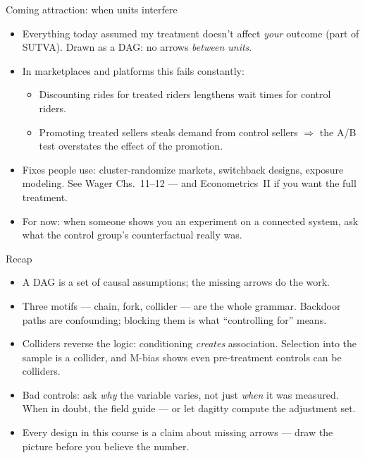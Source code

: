 \documentclass[aspectratio=169,11pt]{beamer}
\begin{document}
\begin{frame}{Coming attraction: when units interfere}
\begin{itemize}
	\item Everything today assumed my treatment doesn't affect \emph{your} outcome
	(part of \alert{SUTVA}). Drawn as a DAG: no arrows \emph{between units}.

	\medskip
	\item In marketplaces and platforms this fails constantly:
	\begin{itemize}
		\item Discounting rides for treated riders lengthens wait times for control riders.
		\item Promoting treated sellers steals demand from control sellers
		$\Rightarrow$ the A/B test \alert{overstates} the effect of the promotion.
	\end{itemize}

	\medskip
	\item Fixes people use: cluster-randomize markets, switchback designs,
	exposure modeling. See Wager Chs.~11--12 --- and Econometrics~II if you want the
	full treatment.

	\medskip
	\item For now: when someone shows you an experiment on a \alert{connected} system,
	ask what the control group's counterfactual really was.
\end{itemize}
\end{frame}


\begin{frame}{Recap}
\begin{itemize}
	\item A DAG is a set of causal assumptions; the missing arrows do the work.
	\item Three motifs --- chain, fork, collider --- are the whole grammar. Backdoor
	paths are confounding; blocking them is what ``controlling for'' means.
	\item Colliders reverse the logic: conditioning \emph{creates} association.
	Selection into the sample is a collider, and M-bias shows even pre-treatment
	controls can be colliders.
	\item Bad controls: ask \emph{why} the variable varies, not just \emph{when} it
	was measured. When in doubt, the field guide --- or let dagitty compute the
	adjustment set.
	\item Every design in this course is a claim about missing arrows --- draw the
	picture before you believe the number.
\end{itemize}
\end{frame}
\end{document}
